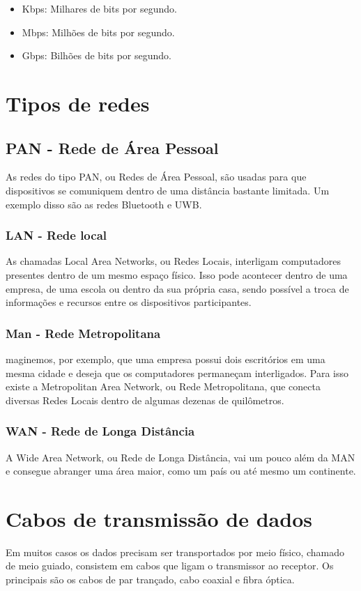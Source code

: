 \documentclass[12pt,a4, oneside, brazil]{article}
\begin{document}
	\begin{itemize}
		\item Kbps: Milhares de bits por segundo.
		\item Mbps: Milhões de bits por segundo.
		\item Gbps: Bilhões de bits por segundo.
	\end{itemize}

	\section{Tipos de redes}
	\subsection{PAN - Rede de Área Pessoal}
	As redes do tipo PAN, ou Redes de Área Pessoal, são usadas para que dispositivos se comuniquem dentro de uma distância bastante limitada. Um exemplo disso são as redes Bluetooth e UWB.
	
	\subsubsection{LAN - Rede local}
	As chamadas Local Area Networks, ou Redes Locais, interligam computadores presentes dentro de um mesmo espaço físico. Isso pode acontecer dentro de uma empresa, de uma escola ou dentro da sua própria casa, sendo possível a troca de informações e recursos entre os dispositivos participantes.
	
	\subsubsection{Man - Rede Metropolitana}
	maginemos, por exemplo, que uma empresa possui dois escritórios em uma mesma cidade e deseja que os computadores permaneçam interligados. Para isso existe a Metropolitan Area Network, ou Rede Metropolitana, que conecta diversas Redes Locais dentro de algumas dezenas de quilômetros.
	
	\subsubsection{WAN - Rede de Longa Distância}
	A Wide Area Network, ou Rede de Longa Distância, vai um pouco além da MAN e consegue abranger uma área maior, como um país ou até mesmo um continente.
	
	\section{Cabos de transmissão de dados}
	Em muitos casos os dados precisam ser transportados por meio físico, chamado de meio guiado, consistem em cabos que ligam o transmissor ao receptor. Os principais são os cabos de par trançado, cabo coaxial e fibra óptica.
	
\end{document}
